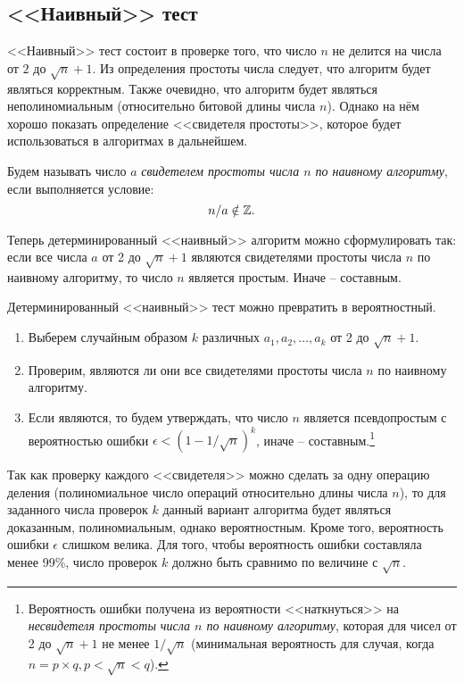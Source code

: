 \subsection{<<Наивный>> тест}\label{section-prime-check-naive}

<<Наивный>> тест состоит в проверке того, что число $n$ не делится на числа от $2$ до $\sqrt{n}+1$. Из определения простоты числа следует, что алгоритм будет являться корректным. Также очевидно, что алгоритм будет являться неполиномиальным (относительно битовой длины числа $n$). Однако на нём хорошо показать определение <<свидетеля простоты>>, которое будет использоваться в алгоритмах в дальнейшем.

Будем называть число $a$ \emph{свидетелем простоты числа $n$ по наивному алгоритму}, если выполняется условие:
\[
	n / a \notin \mathbb{Z}.
\]

Теперь детерминированный <<наивный>> алгоритм можно сформулировать так: если все числа $a$ от 2 до $\sqrt{n}+1$ являются свидетелями простоты числа $n$ по наивному алгоритму, то число $n$ является простым. Иначе -- составным.

Детерминированный <<наивный>> тест можно превратить в вероятностный.

\begin{enumerate}
	\item Выберем случайным образом $k$ различных $a_1, a_2, \dots, a_k$ от 2 до $\sqrt{n}+1$.
	\item Проверим, являются ли они все свидетелями простоты числа $n$ по наивному алгоритму. 
	\item Если являются, то будем утверждать, что число $n$ является псевдопростым с вероятностью ошибки $\epsilon < \left( 1 - 1 / \sqrt{n} \right)^k$, иначе -- составным.\footnote{Вероятность ошибки получена из вероятности <<наткнуться>> на \emph{несвидетеля простоты числа $n$ по наивному алгоритму}, которая для чисел от 2 до $\sqrt{n}+1$ не менее $1 / \sqrt{n}$ (минимальная вероятность для случая, когда $n = p \times q, p < \sqrt{n} < q$).}
\end{enumerate}

Так как проверку каждого <<свидетеля>> можно сделать за одну операцию деления (полиномиальное число операций относительно длины числа $n$), то для заданного числа проверок $k$ данный вариант алгоритма будет являться доказанным, полиномиальным, однако вероятностным. Кроме того, вероятность ошибки $\epsilon$ слишком велика.  Для того, чтобы вероятность ошибки составляла менее 99\%, число проверок $k$ должно быть сравнимо по величине с $\sqrt{n}$.
